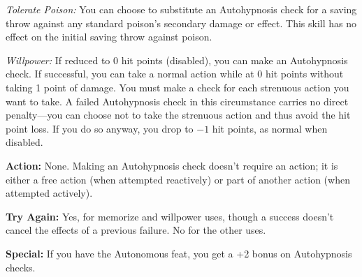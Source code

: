 \textit{Tolerate Poison:} You can choose to substitute an Autohypnosis check for a saving throw against any standard poison's secondary damage or effect. This skill has no effect on the initial saving throw against poison.

\textit{Willpower:} If reduced to 0 hit points (disabled), you can make an Autohypnosis check. If successful, you can take a normal action while at 0 hit points without taking 1 point of damage. You must make a check for each strenuous action you want to take. A failed Autohypnosis check in this circumstance carries no direct penalty---you can choose not to take the strenuous action and thus avoid the hit point loss. If you do so anyway, you drop to $-1$ hit points, as normal when disabled.

\textbf{Action:} None. Making an Autohypnosis check doesn't require an action; it is either a free action (when attempted reactively) or part of another action (when attempted actively).

\textbf{Try Again:} Yes, for memorize and willpower uses, though a success doesn't cancel the effects of a previous failure. No for the other uses.

\textbf{Special:} If you have the Autonomous feat, you get a +2 bonus on Autohypnosis checks.